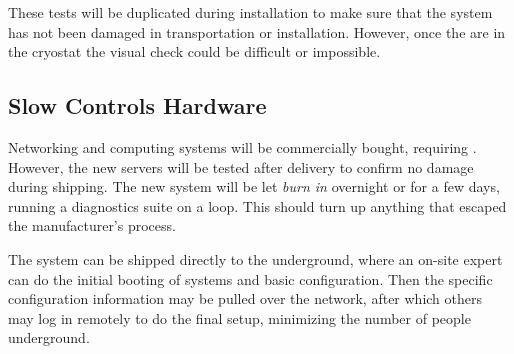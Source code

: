 These tests will be duplicated during
installation to make sure that the system has
not been damaged in transportation or installation. However, once
the  are in the cryostat the visual check could be difficult or impossible.


\subsection{Slow Controls Hardware}
\label{sec:fdgen-slow-cryo-qc-sc-hard}

Networking and computing systems will be commercially bought, requiring . However, the new servers will be tested after delivery to confirm no damage during shipping. The new system will be let \textit{burn in} overnight or for a few days, 
running a diagnostics suite on a loop. This should turn up anything that escaped the manufacturer's  process.

The system can be shipped directly to the underground, 
where an on-site
expert can do the initial booting of systems and basic
configuration. Then the specific configuration information may be pulled over
the network, after which others may log in remotely to do the final
setup, minimizing the number of people underground.

 

